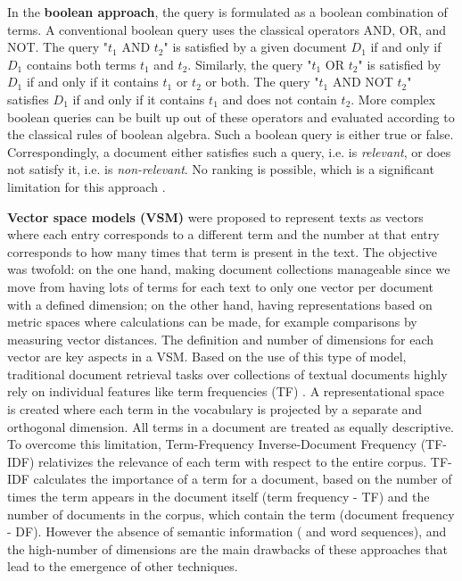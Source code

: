 In the \textbf{boolean approach}, the query is formulated as a boolean combination of terms. A conventional boolean query uses the classical operators AND, OR, and NOT. The query "$t_1$ AND $t_2$" is satisfied by a given document $D_1$ if and only if $D_1$ contains both terms $t_1$ and $t_2$. Similarly, the query "$t_1$ OR $t_2$" is satisfied by $D_1$ if and only if it contains $t_1$ or $t_2$ or both. The query "$t_1$ AND NOT $t_2$" satisfies $D_1$ if and only if it contains $t_1$ and does not contain $t_2$. More complex boolean queries can be built up out of these operators and evaluated according to the classical rules of boolean algebra. Such a boolean query is either true or false. Correspondingly, a document either satisfies such a query, i.e. is \textit{relevant}, or does not satisfy it, i.e. is \textit{non-relevant}. No ranking is possible, which is a significant limitation for this approach \citep{harmon1995}. 

\textbf{Vector space models (VSM)} \citep{Salton1983} were proposed to represent texts as vectors where each entry corresponds to a different term and the number at that entry corresponds to how many times that term is present in the text. The objective was twofold: on the one hand, making document collections manageable since we move from having lots of terms for each text to only one vector per document with a defined dimension; on the other hand, having representations based on metric spaces where calculations can be made, for example comparisons by measuring vector distances. The definition and number of dimensions for each vector are key aspects in a VSM. Based on the use of this type of model, traditional document retrieval tasks over collections of textual documents highly rely on individual features like term frequencies (TF) \citep{Hearst1999}. A representational space is created where each term in the vocabulary is projected by a separate and orthogonal dimension. All terms in a document are treated as equally descriptive. To overcome this limitation, Term-Frequency Inverse-Document Frequency (TF-IDF) \citep{lee1995} relativizes the relevance of each term with respect to the entire corpus. TF-IDF calculates the importance of a term for a document, based on the number of times the term appears in the document itself (term frequency - TF) and the number of documents in the corpus, which contain the term (document frequency - DF). However the absence of semantic information ( and word sequences), and the high-number of dimensions are the main drawbacks of these approaches that lead to the emergence of other techniques. 

